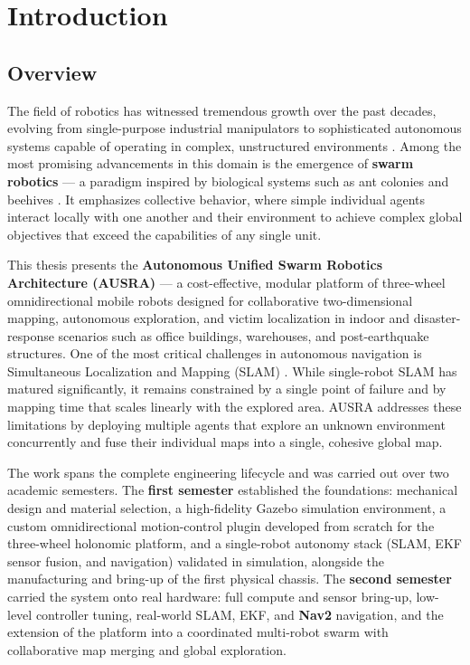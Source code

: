 
\chapter{Introduction}
\label{chap:introduction}

\section{Overview}
\label{sec:overview}

The field of robotics has witnessed tremendous growth over the past decades, evolving from single-purpose industrial manipulators to sophisticated autonomous systems capable of operating in complex, unstructured environments \cite{siciliano2016robotics}. Among the most promising advancements in this domain is the emergence of \textbf{swarm robotics} --- a paradigm inspired by biological systems such as ant colonies and beehives \cite{dorigo2021swarm}. It emphasizes collective behavior, where simple individual agents interact locally with one another and their environment to achieve complex global objectives that exceed the capabilities of any single unit.

This thesis presents the \textbf{Autonomous Unified Swarm Robotics Architecture (AUSRA)} --- a cost-effective, modular platform of three-wheel omnidirectional mobile robots designed for collaborative two-dimensional mapping, autonomous exploration, and victim localization in indoor and disaster-response scenarios such as office buildings, warehouses, and post-earthquake structures. One of the most critical challenges in autonomous navigation is Simultaneous Localization and Mapping (SLAM) \cite{thrun2005probabilistic}. While single-robot SLAM has matured significantly, it remains constrained by a single point of failure and by mapping time that scales linearly with the explored area. AUSRA addresses these limitations by deploying multiple agents that explore an unknown environment concurrently and fuse their individual maps into a single, cohesive global map.

The work spans the complete engineering lifecycle and was carried out over two academic semesters. The \textbf{first semester} established the foundations: mechanical design and material selection, a high-fidelity Gazebo simulation environment, a custom omnidirectional motion-control plugin developed from scratch for the three-wheel holonomic platform, and a single-robot autonomy stack (SLAM, EKF sensor fusion, and navigation) validated in simulation, alongside the manufacturing and bring-up of the first physical chassis. The \textbf{second semester} carried the system onto real hardware: full compute and sensor bring-up, low-level controller tuning, real-world SLAM, EKF, and \textbf{Nav2} navigation, and the extension of the platform into a coordinated multi-robot swarm with collaborative map merging and global exploration.

